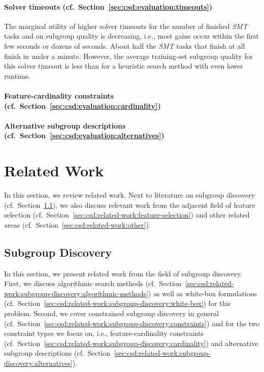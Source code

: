 \documentclass{article}
\theoremstyle{definition}
\begin{document}
\paragraph{Solver timeouts (cf.~Section~\ref{sec:csd:evaluation:timeouts})}

The marginal utility of higher solver timeouts for the number of finished \emph{SMT} tasks and on subgroup quality is decreasing, i.e., most gains occur within the first few seconds or dozens of seconds.
About half the \emph{SMT} tasks that finish at all finish in under a minute.
However, the average training-set subgroup quality for this solver timeout is less than for a heuristic search method with even lower runtime.

\paragraph{Feature-cardinality constraints (cf.~Section~\ref{sec:csd:evaluation:cardinality})}

\paragraph{Alternative subgroup descriptions (cf.~Section~\ref{sec:csd:evaluation:alternatives})}

\section{Related Work}
\label{sec:csd:related-work}

In this section, we review related work.
Next to literature on subgroup discovery (cf.~Section~\ref{sec:csd:related-work:subgroup-discovery}), we also discuss relevant work from the adjacent field of feature selection (cf.~Section~\ref{sec:csd:related-work:feature-selection}) and other related areas (cf.~Section~\ref{sec:csd:related-work:other}).

\subsection{Subgroup Discovery}
\label{sec:csd:related-work:subgroup-discovery}

In this section, we present related work from the field of subgroup discovery.
First, we discuss algorithmic search methods (cf.~Section~\ref{sec:csd:related-work:subgroup-discovery:algorithmic-methods}) as well as white-box formulations (cf.~Section~\ref{sec:csd:related-work:subgroup-discovery:white-box}) for this problem.
Second, we cover constrained subgroup discovery in general (cf.~Section~\ref{sec:csd:related-work:subgroup-discovery:constraints}) and for the two constraint types we focus on, i.e., feature-cardinality constraints (cf.~Section~\ref{sec:csd:related-work:subgroup-discovery:cardinality}) and alternative subgroup descriptions (cf.~Section~\ref{sec:csd:related-work:subgroup-discovery:alternatives}).
\end{document}
